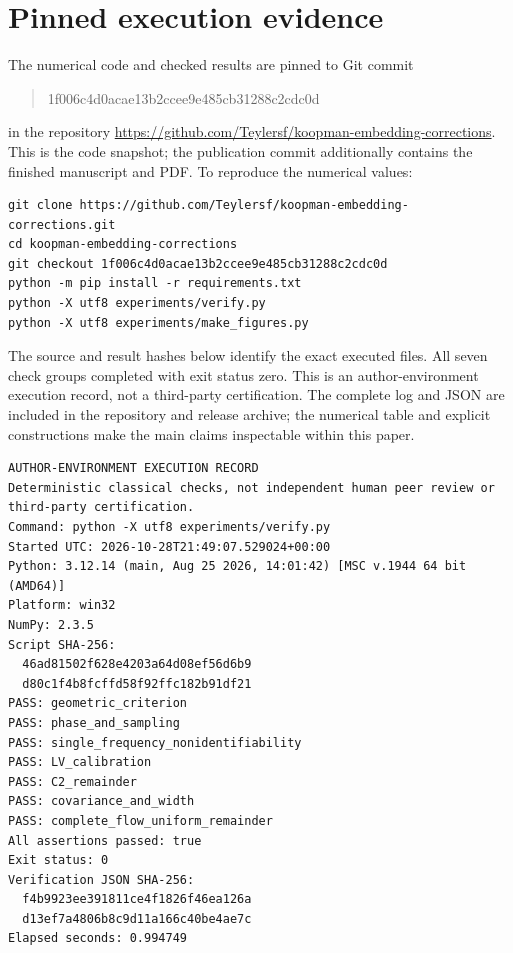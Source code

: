 \section{Pinned execution evidence}
\label{sec:execution}
The numerical code and checked results are pinned to Git commit
\begin{quote}\small\ttfamily
1f006c4d0acae13b2ccee9e485cb31288c2cdc0d
\end{quote}
in the repository
\url{https://github.com/Teylersf/koopman-embedding-corrections}.
This is the code snapshot; the publication commit additionally contains the
finished manuscript and PDF. To reproduce the numerical values:
\begin{Verbatim}[fontsize=\small]
git clone https://github.com/Teylersf/koopman-embedding-corrections.git
cd koopman-embedding-corrections
git checkout 1f006c4d0acae13b2ccee9e485cb31288c2cdc0d
python -m pip install -r requirements.txt
python -X utf8 experiments/verify.py
python -X utf8 experiments/make_figures.py
\end{Verbatim}
The source and result hashes below identify the exact executed files. All
seven check groups completed with exit status zero. This is an author-environment
execution record, not a third-party certification. The complete log and JSON
are included in the repository and release archive; the numerical table and
explicit constructions make the main claims inspectable within this paper.
\begin{Verbatim}[fontsize=\scriptsize]
AUTHOR-ENVIRONMENT EXECUTION RECORD
Deterministic classical checks, not independent human peer review or third-party certification.
Command: python -X utf8 experiments/verify.py
Started UTC: 2026-10-28T21:49:07.529024+00:00
Python: 3.12.14 (main, Aug 25 2026, 14:01:42) [MSC v.1944 64 bit (AMD64)]
Platform: win32
NumPy: 2.3.5
Script SHA-256:
  46ad81502f628e4203a64d08ef56d6b9
  d80c1f4b8fcffd58f92ffc182b91df21
PASS: geometric_criterion
PASS: phase_and_sampling
PASS: single_frequency_nonidentifiability
PASS: LV_calibration
PASS: C2_remainder
PASS: covariance_and_width
PASS: complete_flow_uniform_remainder
All assertions passed: true
Exit status: 0
Verification JSON SHA-256:
  f4b9923ee391811ce4f1826f46ea126a
  d13ef7a4806b8c9d11a166c40be4ae7c
Elapsed seconds: 0.994749
\end{Verbatim}
